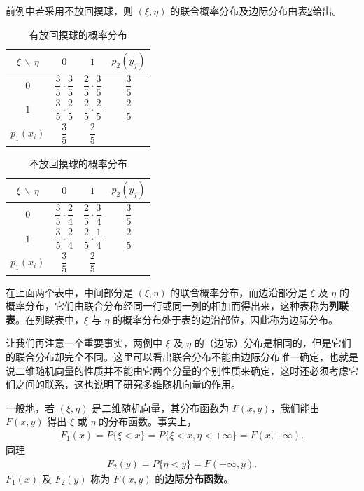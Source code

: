 \documentclass[../../main.tex]{subfiles}
\begin{document}
\begin{example}[不放回摸球]\label{example:ch03-不放回摸球}
前例中若采用不放回摸球，则 $(\xi,\eta)$ 的联合概率分布及边际分布由表\ref{table:ch03-不放回摸球}给出。
\end{example}

\begin{table}[H]
\centering
\caption{有放回摸球的概率分布}
\label{table:ch03-有放回摸球}
\begin{tabular}{c|ccc}
$\xi$ $\backslash$ $\eta$ & $0$ & $1$ & $p_2(y_j)$\\
\hline
$0$ & $\dfrac{3}{5}\cdot\dfrac{3}{5}$ & $\dfrac{2}{5}\cdot\dfrac{3}{5}$ & $\dfrac{3}{5}$\\
$1$ & $\dfrac{3}{5}\cdot\dfrac{2}{5}$ & $\dfrac{2}{5}\cdot\dfrac{2}{5}$ & $\dfrac{2}{5}$\\
\hline
$p_1(x_i)$ & $\dfrac{3}{5}$ & $\dfrac{2}{5}$ & \\
\end{tabular}
\end{table}

\begin{table}[H]
\centering
\caption{不放回摸球的概率分布}
\label{table:ch03-不放回摸球}
\begin{tabular}{c|ccc}
$\xi$ $\backslash$ $\eta$ & $0$ & $1$ & $p_2(y_j)$\\
\hline
$0$ & $\dfrac{3}{5}\cdot\dfrac{2}{4}$ & $\dfrac{2}{5}\cdot\dfrac{3}{4}$ & $\dfrac{3}{5}$\\
$1$ & $\dfrac{3}{5}\cdot\dfrac{2}{4}$ & $\dfrac{2}{5}\cdot\dfrac{1}{4}$ & $\dfrac{2}{5}$\\
\hline
$p_1(x_i)$ & $\dfrac{3}{5}$ & $\dfrac{2}{5}$ & \\
\end{tabular}
\end{table}

在上面两个表中，中间部分是 $(\xi,\eta)$ 的联合概率分布，而边沿部分是 $\xi$ 及 $\eta$ 的概率分布，它们由联合分布经同一行或同一列的相加而得出来，这种表称为\textbf{列联表}。在列联表中，$\xi$ 与 $\eta$ 的概率分布处于表的边沿部位，因此称为边际分布。

让我们再注意一个重要事实，两例中 $\xi$ 及 $\eta$ 的（边际）分布是相同的，但是它们的联合分布却完全不同。这里可以看出联合分布不能由边际分布唯一确定，也就是说二维随机向量的性质并不能由它两个分量的个别性质来确定，这时还必须考虑它们之间的联系，这也说明了研究多维随机向量的作用。

一般地，若 $(\xi,\eta)$ 是二维随机向量，其分布函数为 $F(x,y)$，我们能由 $F(x,y)$ 得出 $\xi$ 或 $\eta$ 的分布函数。事实上，
\begin{align}
F_1(x)=P\{\xi<x\}=P\{\xi<x,\eta<+\infty\}=F(x,+\infty).\label{align:ch03-边际分布函数xi}
\end{align}
同理
\begin{align*}F_2(y)=P\{\eta<y\}=F(+\infty,y).\end{align*}
$F_1(x)$ 及 $F_2(y)$ 称为 $F(x,y)$ 的\textbf{边际分布函数}。
\end{document}
